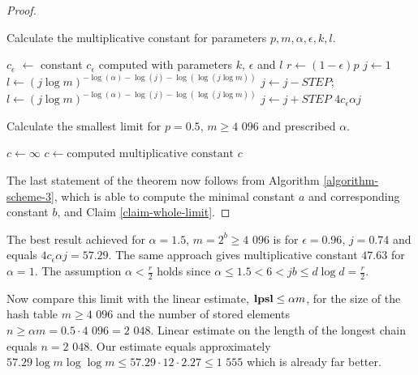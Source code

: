 \begin{proof}
\begin{algorithm}[H]
\caption{Calculate the multiplicative constant for parameters $p, m, \alpha, \epsilon, k, l$.}
\label{procedure-scheme-3}
\begin{algorithmic}
\STATE $c_\epsilon$ $\leftarrow$ constant $c_\epsilon$ computed with parameters $k$, $\epsilon$ and $l$
\STATE $r \leftarrow (1 - \epsilon)p$ 
\STATE $j \leftarrow 1$
\STATE 
\STATE {}
\STATE $l \leftarrow (j \log m) ^ {-\log(\alpha) - \log(j) - \log(\log(j \log m))}$
	\STATE $j \leftarrow j - STEP$;
	\STATE $l \leftarrow (j \log m) ^ {-\log(\alpha) - \log(j) - \log(\log(j \log m))}$
\ENDWHILE
\STATE
\STATE $j \leftarrow j + STEP$
\RETURN $4 c_\epsilon \alpha j$
\end{algorithmic}
\end{algorithm}

\begin{algorithm}[H]
\caption{Calculate the smallest limit for $p=0.5$, $m \geq \text{4 096}$ and prescribed $\alpha$.}
\label{algorithm-scheme-3}
\begin{algorithmic}
\STATE $c \leftarrow \infty$
				\STATE $c \leftarrow \text{computed multiplicative constant}$
			\ENDIF
		\ENDFOR
	\ENDFOR
\ENDFOR
\STATE
\RETURN $c$
\end{algorithmic}
\end{algorithm}

The last statement of the theorem now follows from Algorithm \ref{algorithm-scheme-3}, which is able to compute the minimal constant $a$ and corresponding constant $b$, and Claim \ref{claim-whole-limit}.
\end{proof}

The best result achieved for $\alpha = 1.5$, $m = 2 ^ b \geq \text{4 096}$ is for $\epsilon = 0.96$, $j = 0.74$ and equals $4 c_\epsilon \alpha j = 57.29$. The same approach gives multiplicative constant $47.63$ for $\alpha = 1$. The assumption $\alpha < \frac{r}{2}$ holds since $\alpha \leq 1.5 < 6 < jb \leq d \log d = \frac{r}{2}$.

Now compare this limit with the linear estimate, $\mathbf{lpsl} \leq \alpha m$, for the size of the hash table $m \geq \text{4 096}$ and the number of stored elements $n \geq \alpha m = 0.5 \cdot \text{4 096} = \text{2 048}$. Linear estimate on the length of the longest chain equals $n = \text{2 048}$. Our estimate equals approximately $57.29 \log m \log \log m \leq 57.29 \cdot 12 \cdot 2.27 \leq \text{1 555}$ which is already far better. 

